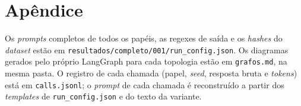 \documentclass[12pt]{article}
\begin{document}
\section*{Apêndice}
\label{sec:anexo}

Os \textit{prompts} completos de todos os papéis, as regexes de saída e os \textit{hashes} do \textit{dataset} estão em \texttt{resultados/completo/001/run\_config.json}. Os diagramas gerados pelo próprio LangGraph para cada topologia estão em \texttt{grafos.md}, na mesma pasta. O registro de cada chamada (papel, \textit{seed}, resposta bruta e \textit{tokens}) está em \texttt{calls.jsonl}; o \textit{prompt} de cada chamada é reconstruído a partir dos \textit{templates} de \texttt{run\_config.json} e do texto da variante.


\newpage
{}
\end{document}
